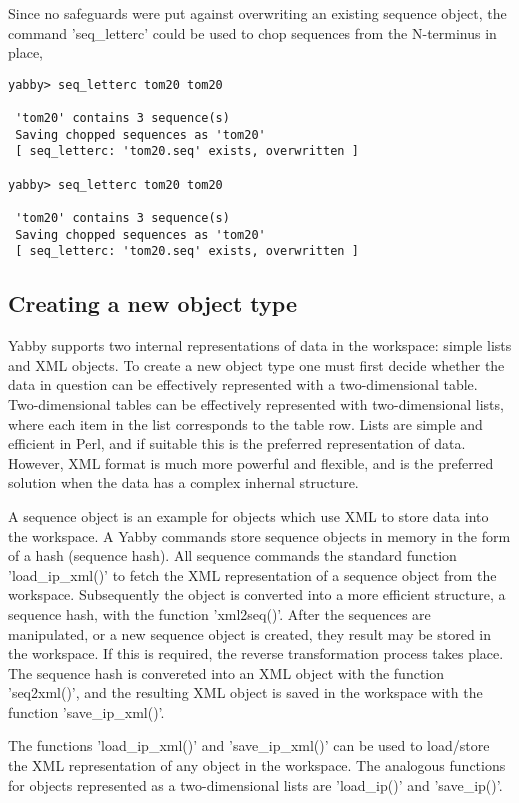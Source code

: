 Since no safeguards were put against overwriting an existing
sequence object, the command 'seq\_letterc' could be used to
chop sequences from the N-terminus in place,

\begin{verbatim}
yabby> seq_letterc tom20 tom20

 'tom20' contains 3 sequence(s)
 Saving chopped sequences as 'tom20'
 [ seq_letterc: 'tom20.seq' exists, overwritten ]

yabby> seq_letterc tom20 tom20

 'tom20' contains 3 sequence(s)
 Saving chopped sequences as 'tom20'
 [ seq_letterc: 'tom20.seq' exists, overwritten ]
\end{verbatim}

\subsection{Creating a new object type}

Yabby supports two internal representations of data in the workspace:
simple lists and XML objects. To create a new object type one must
first decide whether the data in question can be effectively
represented with a two-dimensional table. Two-dimensional tables
can be effectively represented with two-dimensional lists, where
each item in the list corresponds to the table row. Lists are simple
and efficient in Perl, and if suitable this is the preferred
representation of data. However, XML format is much more powerful
and flexible, and is the preferred solution when the data has
a complex inhernal structure.

A sequence object is an example for objects which use XML to store 
data into the workspace. A Yabby commands store sequence objects
in memory in the form of a hash (sequence hash).  All sequence
commands the standard function 'load\_ip\_xml()' to fetch the XML
representation of a sequence object from the workspace. Subsequently
the object is converted into a more efficient structure, a
sequence hash, with the function 'xml2seq()'. After the sequences
are manipulated, or a new sequence object is created, they result
may be stored in the workspace. If this is required, the reverse
transformation process takes place.  The sequence hash is convereted
into an XML object with the function 'seq2xml()', and the resulting
XML object is saved in the workspace with the function 'save\_ip\_xml()'.

The functions 'load\_ip\_xml()' and 'save\_ip\_xml()' can be used
to load/store the XML representation of any object in the workspace.
The analogous functions for objects represented as a two-dimensional
lists are 'load\_ip()' and 'save\_ip()'.

